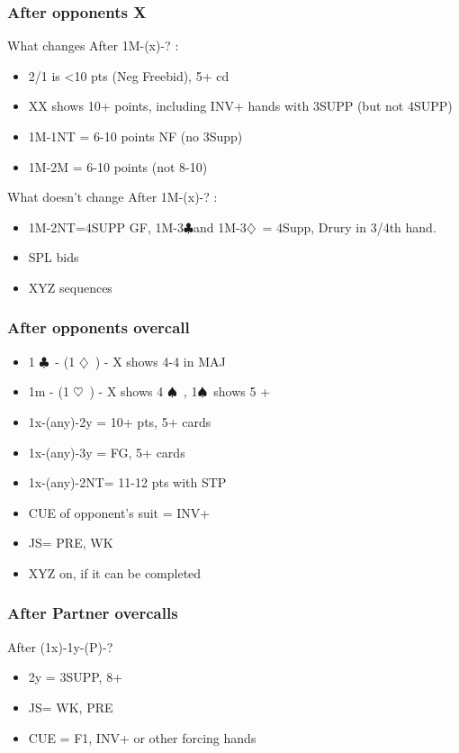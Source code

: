 \documentclass{article}
\newcommand\C{\ensuremath{\clubsuit}}
\newcommand\D{\ensuremath{\diamondsuit}}
\renewcommand\H{\ensuremath{\heartsuit}}
\renewcommand\S{\ensuremath{\spadesuit}}
\begin{document}
\begin{multicols}{2}
  \subsubsection{After opponents X}
  What changes After 1M-(x)-?  :
  \begin{itemize}
    \item 2/1 is <10 pts (Neg Freebid), 5+ cd
    \item XX shows 10+ points, including INV+ hands with 3SUPP (but not 4SUPP)
    \item 1M-1NT = 6-10 points NF (no 3Supp)
    \item 1M-2M = 6-10 points (not 8-10)
  \end{itemize}
  What doesn't change After 1M-(x)-?  :
  \begin{itemize}
    \item 1M-2NT=4SUPP GF, 1M-3\C and 1M-3\D\ = 4Supp, Drury in 3/4th hand. 
    \item SPL bids
    \item XYZ sequences
  \end{itemize}
  \subsubsection{After opponents overcall}
  \begin{itemize}
    \item 1 \C\ - (1 \D\ ) - X shows 4-4 in MAJ 
    \item 1m - (1 \H\ ) - X shows 4 \S\ , 1\S\  shows 5 +
    \item 1x-(any)-2y = 10+ pts, 5+  cards
    \item 1x-(any)-3y = FG, 5+  cards
    \item 1x-(any)-2NT= 11-12 pts with STP
    \item CUE of opponent's suit = INV+
    \item JS= PRE, WK
    \item XYZ on, if it can be completed
  \end{itemize}
  \subsubsection{After Partner overcalls}
  After (1x)-1y-(P)-?
  \begin{itemize}
    \item 2y = 3SUPP, 8+
     \item JS= WK, PRE
     \item CUE = F1, INV+ or other forcing hands
  \end{itemize}

\end{multicols}
\end{document}
